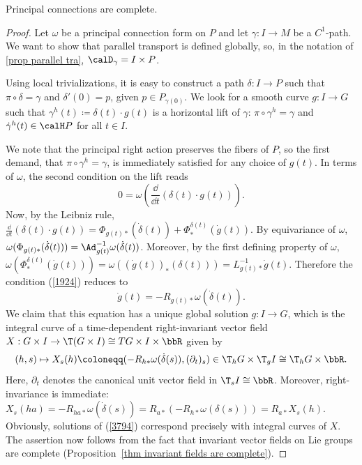 \begin{prop}
    Principal connections are complete.
\end{prop}
\begin{proof}
    Let $\omega$ be a principal connection form on $P$ and let $\gamma:I\to M$ be a $C^1$-path. We want to show that parallel transport is defined globally, so, in the notation of \ref{prop parallel tra}, $\calD_\gamma=I\times P$.

    Using local trivializations, it is easy to construct a path $\delta:I\to P$ such that $\pi\circ\delta=\gamma$ and $\delta'(0)=p$, given $p\in P_{\gamma(0)}$. We look for a smooth curve $g:I\to G$ such that $\gamma^h(t)\coloneqq \delta(t)\cdot g(t)$ is a horizontal lift of $\gamma$: $\pi\circ\gamma^h=\gamma$ and $\dot\gamma^h(t)\in \calH P$ for all $t\in I$. 

    We note that the principal right action preserves the fibers of $P$, so the first demand, that $\pi\circ \gamma^h=\gamma$, is immediately satisfied for any choice of $g(t)$. In terms of $\omega$, the second condition on the lift reads
    \[0=\omega\left(\frac{\dd}{\dd t}(\delta(t)\cdot g(t))\right).\label{1924}\]
    Now, by the Leibniz rule, $\frac{\dd}{\dd t}(\delta(t)\cdot g(t))=\Phi_{g(t)\ast}(\dot\delta(t))+\Phi^{\delta(t)}_\ast(\dot g(t))$. By equivariance of $\omega$, $\omega(\Phi_{g(t)\ast}(\dot\delta(t)))=\Ad_{g(t)}^{-1}\omega(\dot\delta(t))$. Moreover, by the first defining property of $\omega$, $\omega(\Phi^{\delta(t)}_\ast(\dot g(t)))=\omega((\dot g(t))_{\ast}(\delta(t)))=L_{g(t)\ast}^{-1}\dot g(t)$. Therefore the condition (\ref{1924}) reduces to
    \[\dot g(t)=-R_{g(t)\ast}\omega(\dot\delta(t)).\label{3794}\]
    We claim that this equation has a unique global solution $g:I\to G$, which is the integral curve of a time-dependent right-invariant vector field $X: G\times I\to \T(G\times I)\cong TG\times I\times \bbR$ given by
    \[(h,s)\mapsto X_s(h)\coloneqq (-R_{h\ast}\omega(\dot\delta(s)),(\partial_t)_s)\in \T_hG\times \T_gI\cong \T_hG\times \bbR.\]
    Here, $\partial_t$ denotes the canonical unit vector field in $\T_sI\cong\bbR$. Moreover, right-invariance is immediate: $X_s(ha)=-R_{ha\ast}\omega(\dot\delta(s))=R_{a\ast}(-R_{h\ast}\omega(\delta(s)))=R_{a\ast}X_s(h)$. Obviously, solutions of (\ref{3794}) correspond precisely with integral curves of $X$. The assertion now follows from the fact that invariant vector fields on Lie groups are complete (Proposition~\ref{thm invariant fields are complete}).
\end{proof}

